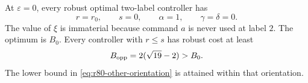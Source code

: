 \begin{lemma}
\label{lem:r80-boundary-rigidity}
At $\varepsilon=0$, every robust optimal two-label controller has
\begin{equation}\label{eq:r80-rigid-controller}
 r=r_0,\qquad s=0,\qquad
 \alpha=1,\qquad\gamma=\delta=0.
\end{equation}
The value of $\xi$ is immaterial because command $a$ is never used
at label $2$.  The optimum is $B_0$.
Every controller with $r\le s$ has robust cost at least
\begin{equation}\label{eq:r80-other-orientation}
 B_{\rm opp}=2(\sqrt{19}-2)>B_0.
\end{equation}
The lower bound in \eqref{eq:r80-other-orientation} is attained
within that orientation.
\end{lemma}
